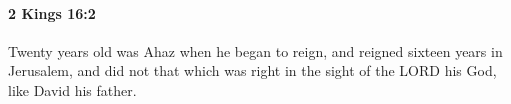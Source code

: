 
		\paragraph{2 Kings 16:2} %
			\label{2KINGS-16-2}

			Twenty years old was Ahaz when he began to reign, and reigned sixteen years in Jerusalem, and did not that which was right in the sight of the LORD his God, like David his father.


